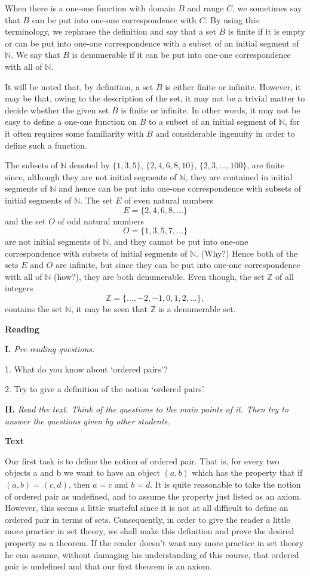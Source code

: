 \documentclass[a4paper]{article}
\newcounter{EUnits}
\newcommand{\EUnit}{\par\medskip{\huge \textbf{Unit \arabic{EUnits}}}\par\stepcounter{EUnits}}
\newcommand{\ESect}[1]{\medskip\par{\large \textbf{#1}}\par}
\newcommand{\ETask}[2]{\medskip\par\textbf{#1.} \textit{#2}\par}
\begin{document}
When there is a one-one function with domain $B$ and range $C$, we sometimes say that $B$ can be put into one-one correspondence
with $C$. By using this terminology, we rephrase the definition and say that a set $B$ is finite if it is empty or can be put
into one-one correspondence with a subset of an initial segment of $\mathbb{N}$. We say that $B$ is denumerable if it can be put
into one-one correspondence with all of $\mathbb{N}$.

It will be noted that, by definition, a set $B$ is either finite or infinite. However, it may be that, owing to the description
of the set, it may not be a trivial matter to decide whether the given set $B$ is finite or infinite. In other words, it may not
be easy to define a one-one function on $B$ to a subset of an initial segment of $\mathbb{N}$, for it often requires some
familiarity with $B$ and considerable ingenuity in order to define such a function.

The subsets of $\mathbb{N}$ denoted by $\{1,3,5\}$, $\{2,4,6,8, 10\}$, $\{2, 3,..., 100\}$, are finite since, although they are
not initial segments of $\mathbb{N}$, they are contained in initial segments of $\mathbb{N}$ and hence can be put into one-one
correspondence with subsets of initial segments of $\mathbb{N}$. The set $E$ of even natural numbers $$E = \{2,4,6,8,...\}$$
and the set $O$ of odd natural numbers $$O = \{1,3,5,7,...\}$$ are not initial segments of $\mathbb{N}$, and they cannot be put
into one-one correspondence with subsets of initial segments of $\mathbb{N}$. (Why?) Hence both of the sets $E$ and $O$ are infinite,
but since they can be put into one-one correspondence with all of $\mathbb{N}$ (how?), they are both denumerable. Even though,
the set $\mathbb{Z}$ of all integers $$\mathbb{Z} = \{...,-2,-1,0,1,2,...\},$$ contains the set $\mathbb{N}$, it may be seen that
$\mathbb{Z}$ is a denumerable set.

\EUnit

\ESect{Reading}

\ETask{I}{Pre-reading questions:}
1. What do you know about `ordered pairs'?

2. Try to give a definition of the notion `ordered pairs'.

\ETask{II}{Read the text. Think of the questions to the main points of it. Then try to answer the questions given by other students.}

\ESect{Text}
Our first task is to define the notion of ordered pair. That is, for every two objects a and b we want to have an object $(a, b)$
which has the property that if $(a, b) = (c, d)$, then $a = c$ and $b = d$. It is quite reasonable to take the notion of ordered
pair as undefined, and to assume the property just listed as an axiom. However, this seems a little wasteful since it is not at
all difficult to define an ordered pair in terms of sets. Consequently, in order to give the reader a little more practice in set
theory, we shall make this definition and prove the desired property as a theorem. If the reader doesn't want any more practice
in set theory he can assume, without damaging his understanding of this course, that ordered pair is undefined and that our first
theorem is an axiom.
\end{document}
